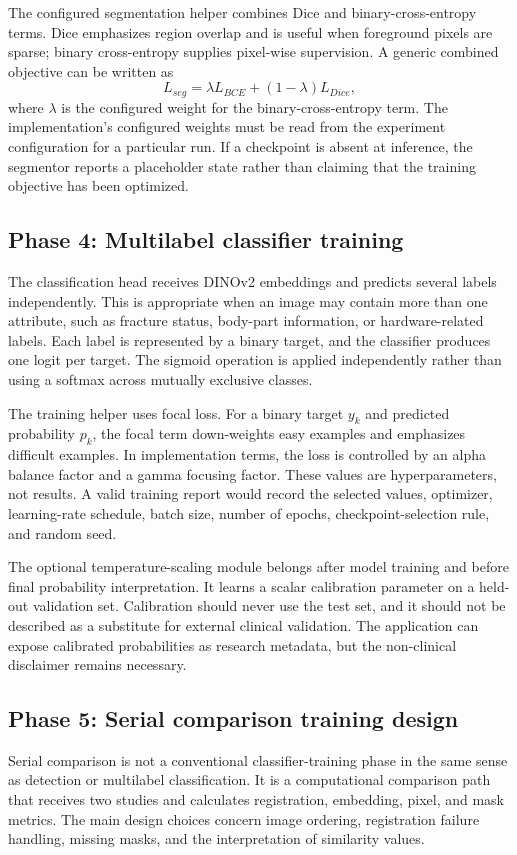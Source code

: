 \documentclass[12pt,a4paper]{article}
\begin{document}
The configured segmentation helper combines Dice and binary-cross-entropy terms. Dice emphasizes region overlap and is useful when foreground pixels are sparse; binary cross-entropy supplies pixel-wise supervision. A generic combined objective can be written as
\[
 L_{seg}=\lambda L_{BCE}+(1-\lambda)L_{Dice},
\]
where $\lambda$ is the configured weight for the binary-cross-entropy term. The implementation's configured weights must be read from the experiment configuration for a particular run. If a checkpoint is absent at inference, the segmentor reports a placeholder state rather than claiming that the training objective has been optimized.

\subsection{Phase 4: Multilabel classifier training}
The classification head receives DINOv2 embeddings and predicts several labels independently. This is appropriate when an image may contain more than one attribute, such as fracture status, body-part information, or hardware-related labels. Each label is represented by a binary target, and the classifier produces one logit per target. The sigmoid operation is applied independently rather than using a softmax across mutually exclusive classes.

The training helper uses focal loss. For a binary target $y_k$ and predicted probability $p_k$, the focal term down-weights easy examples and emphasizes difficult examples. In implementation terms, the loss is controlled by an alpha balance factor and a gamma focusing factor. These values are hyperparameters, not results. A valid training report would record the selected values, optimizer, learning-rate schedule, batch size, number of epochs, checkpoint-selection rule, and random seed.

The optional temperature-scaling module belongs after model training and before final probability interpretation. It learns a scalar calibration parameter on a held-out validation set. Calibration should never use the test set, and it should not be described as a substitute for external clinical validation. The application can expose calibrated probabilities as research metadata, but the non-clinical disclaimer remains necessary.

\subsection{Phase 5: Serial comparison training design}
Serial comparison is not a conventional classifier-training phase in the same sense as detection or multilabel classification. It is a computational comparison path that receives two studies and calculates registration, embedding, pixel, and mask metrics. The main design choices concern image ordering, registration failure handling, missing masks, and the interpretation of similarity values.
\end{document}
